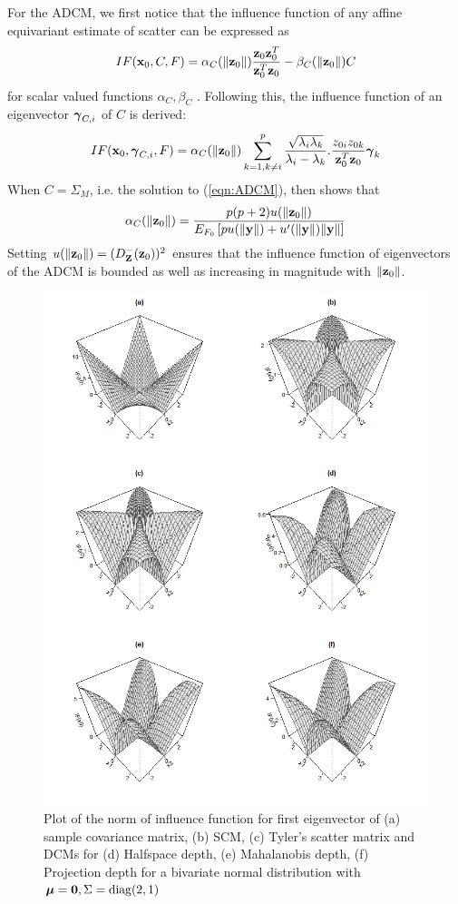 For the ADCM, we first notice that the influence function of any affine equivariant estimate of scatter can be expressed as
%
$$
IF({\bf{x}}_0, C, F) = \alpha_C (\| {\bf{z}}_0 \| ) \frac{{\bf{z}}_0 {\bf{z}}_0^T}{{\bf{z}}_0^T {\bf{z}}_0} - \beta_C( \| {\bf{z}}_0 \| ) C
$$
%
for scalar valued functions $\alpha_C, \beta_C$ \citep{HampelBook86}. Following this, the influence function of an eigenvector ${\boldsymbol{\gamma}}_{C,i}$ of $C$ is derived:
%
$$
IF({\bf{x}}_0, {\boldsymbol{\gamma}}_{C,i}, F) = \alpha_C(\| {\bf{z}}_0 \|) \sum_{k=1, k \neq i}^p \frac{\sqrt {\lambda_i \lambda_k}}{\lambda_i - \lambda_k}. \frac{z_{0i} z_{0k}}{{\bf{z}}_0^T {\bf{z}}_0} {\boldsymbol{\gamma}}_k
$$
%
When $C=\Sigma_M$, i.e. the solution to (\ref{eqn:ADCM}), then \cite{HuberBook81} shows that
%
$$
\alpha_C (\| {\bf{z}}_0 \|) = \frac{p(p+2) u (\| {\bf{z}}_0 \|)}{E_{F_0} \left[ p u(\| {\bf{y}} \| ) + u'(\| {\bf{y}} \|) \| {\bf{y}} \| \right] }
$$
%
Setting $u( \| {\bf{z}}_0 \|) = ( D^-_{\mathbf{Z}} ({\bf{z}}_0))^2$ ensures that the influence function of eigenvectors of the ADCM is bounded as well as increasing in magnitude with $\| {\bf{z}}_0 \|$.

\begin{figure}[]
	\centering
		\includegraphics[width=12cm]{../Codes/IFnorm.png}
	\caption{Plot of the norm of influence function for first eigenvector of (a) sample covariance matrix, (b) SCM, (c) Tyler's scatter matrix and DCMs for (d) Halfspace depth, (e) Mahalanobis depth, (f) Projection depth for a bivariate normal distribution with ${\boldsymbol{\mu}} = {\bf 0}, \Sigma = \operatorname*{diag}(2,1)$}
	\label{fig:IFnorm}
\end{figure}

